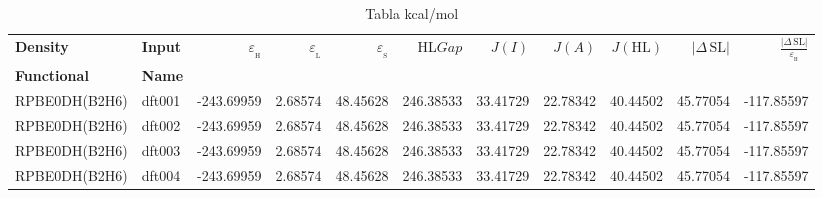 \documentclass[preprint,landscape,12pt]{elsarticle}
\begin{document}
	\begin{table}
		\caption{ Tabla kcal/mol}
		\centering
		\footnotesize
		\begin{tabular}{llrrrrrrrrr}
			\hline
			\textbf{Density} & \textbf{Input} &$\varepsilon_{_{\mathrm{H}}}$	& $\varepsilon_{_{\mathrm{L}}}$  & $\varepsilon_{_{\mathrm{S}}}$& HL$Gap$ & $J(I)$ & $J(A)$ & $J(\mathrm{HL})$  & \textbf{$\left|\Delta\,\mathrm{SL}\right|$} & $\frac{\left|\Delta\,\mathrm{SL}\right|}{\varepsilon_{_{\mathrm{H}}}}$ \\
			\textbf{Functional} & \textbf{Name}&   &  &     &   &  &  &  &  &\\
			\hline \hline 

RPBE0DH(B2H6) & dft001 & -243.69959 & 2.68574 & 48.45628 & 246.38533 & 33.41729 & 22.78342 & 40.44502 & 45.77054 & -117.85597\\
RPBE0DH(B2H6) & dft002 & -243.69959 & 2.68574 & 48.45628 & 246.38533 & 33.41729 & 22.78342 & 40.44502 & 45.77054 & -117.85597\\
RPBE0DH(B2H6) & dft003 & -243.69959 & 2.68574 & 48.45628 & 246.38533 & 33.41729 & 22.78342 & 40.44502 & 45.77054 & -117.85597\\
RPBE0DH(B2H6) & dft004 & -243.69959 & 2.68574 & 48.45628 & 246.38533 & 33.41729 & 22.78342 & 40.44502 & 45.77054 & -117.85597\\

	 		\hline
		\end{tabular}
			\label{tab:kcal/mol}
	\end{table}
\end{document}
